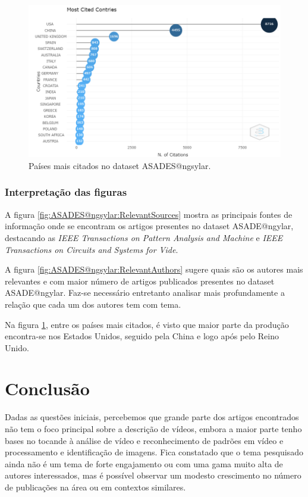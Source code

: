 \begin{figure}[H]
    \centering
    \includegraphics[angle=0,width=1\textwidth]{experiments/ngsylar/PesqBibliogr/Imagens/ASADES-MostCitedCountries.png}
    \caption{Países mais citados no dataset ASADES@ngsylar.}
    \label{fig:ASADES@ngsylar:MostCitedCountries}
\end{figure}

\subsubsection{Interpretação das figuras }

A figura \ref{fig:ASADES@ngsylar:RelevantSources} mostra as principais fontes de informação onde se encontram os artigos presentes no dataset ASADE@ngylar, destacando as \textit{IEEE Transactions on Pattern Analysis and Machine} e \textit{IEEE Transactions on Circuits and Systems for Vide}.

A figura \ref{fig:ASADES@ngsylar:RelevantAuthors} sugere quais são os autores mais relevantes e com maior número de artigos publicados presentes no dataset ASADE@ngylar. Faz-se necessário entretanto analisar mais profundamente a relação que cada um dos autores tem com tema.

Na figura \ref{fig:ASADES@ngsylar:MostCitedCountries}, entre os países mais citados, é visto que maior parte da produção encontra-se nos Estados Unidos, seguido pela China e logo após pelo Reino Unido.

\section{Conclusão}
Dadas as questões iniciais, percebemos que grande parte dos artigos encontrados não tem o foco principal sobre a descrição de vídeos, embora a maior parte tenho bases no tocande à análise de vídeo e reconhecimento de padrões em vídeo e processamento e identificação de imagens. Fica constatado que o tema pesquisado ainda não é um tema de forte engajamento ou com uma gama muito alta de autores interessados, mas é possível observar um modesto crescimento no número de publicações na área ou em contextos similares.

